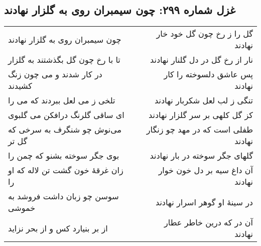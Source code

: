 \begin{center}
\section*{غزل شماره ۲۹۹: چون سیمبران روی به گلزار نهادند}
\label{sec:299}
\begin{longtable}{l p{0.5cm} r}
چون سیمبران روی به گلزار نهادند
&&
گل را ز رخ چون گل خود خار نهادند
\\
تا با رخ چون گل بگذشتند به گلزار
&&
نار از رخ گل در دل گلنار نهادند
\\
در کار شدند و می چون زنگ کشیدند
&&
پس عاشق دلسوخته را کار نهادند
\\
تلخی ز می لعل ببردند که می را
&&
تنگی ز لب لعل شکربار نهادند
\\
ای ساقی گلرنگ درافکن می گلبوی
&&
کز گل کلهی بر سر گلزار نهادند
\\
می‌نوش چو شنگرف به سرخی که گل تر
&&
طفلی است که در مهد چو زنگار نهادند
\\
بوی جگر سوخته بشنو که چمن را
&&
گلهای جگر سوخته در بار نهادند
\\
زان غرقهٔ خون گشت تن لاله که او را
&&
آن داغ سیه بر دل خون خوار نهادند
\\
سوسن چو زبان داشت فروشد به خموشی
&&
در سینهٔ او گوهر اسرار نهادند
\\
از بر بنیارد کس و از بحر نزاید
&&
آن در که درین خاطر عطار نهادند
\\
\end{longtable}
\end{center}
